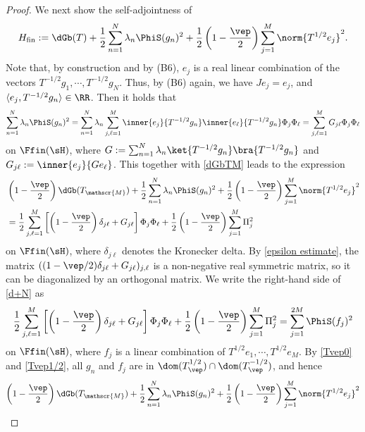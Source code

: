 \documentclass[12pt,draft]{article}
\theoremstyle{plain}
\numberwithin{equation}{section}
\theoremstyle{remark}
\begin{document}
\begin{proof}
We next show the self-adjointness of 
\[
H_{\rm fin}:=\dGb(T)+\frac{1}{2}\sum_{n=1}^N \lambda_n \PhiS(g_n)^2 + \frac{1}{2}\left(1-\frac{\vep}{2}\right) \sum_{j=1}^M \norm{T^{1/2}e_j}^2.
\]
Note that, by construction and by (B6), $e_j$ is a real linear combination of the vectors $T^{-1/2}g_1,\cdots,T^{-1/2}g_N$.
Thus, by (B6) again, we have $Je_j=e_j$, and $\langle e_j,T^{-1/2}g_n\rangle\in\RR$.
Then it holds that
\begin{align*}
 \sum_{n=1}^N \lambda_n \PhiS(g_n)^2
 = \sum_{n=1}^N \lambda_n \sum_{j,\ell=1}^M \inner{e_j}{T^{-1/2}g_n} \inner{e_\ell}{T^{-1/2}g_n} \Phi_j \Phi_\ell  
 = \sum_{j,\ell=1}^M G_{j\ell}\Phi_j \Phi_\ell  
\end{align*}
on $\Ffin(\sH)$, where $G:=\sum_{n=1}^N\lambda_n\ket{T^{-1/2}g_n} \bra{T^{-1/2}g_n}$ and $G_{j\ell}:=\inner{e_j}{Ge_\ell}$.
This together with \eqref{dGbTM} leads to the expression
\begin{align}\label{d+N}
&\left(1-\frac{\vep}{2}\right)\dGb(T_\mathscr{M}) + \frac{1}{2}\sum_{n=1}^N \lambda_n \PhiS(g_n)^2 + \frac{1}{2}\left(1-\frac{\vep}{2}\right) \sum_{j=1}^M \norm{T^{1/2}e_j}^2 \notag \\
&= \frac{1}{2}\sum_{j,\ell=1}^M \left[\left(1-\frac{\vep}{2}\right)\delta_{j\ell}+G_{j\ell}\right]\Phi_j \Phi_\ell  + \frac{1}{2}\left(1-\frac{\vep}{2}\right)\sum_{j=1}^M \Pi_j^2
\end{align}
on $\Ffin(\sH)$, where $\delta_{j\ell}$ denotes the Kronecker delta.
By \eqref{epsilon estimate}, the matrix $((1-\vep/2)\delta_{j\ell}+G_{j\ell})_{j,\ell}$ is a non-negative real symmetric matrix, 
so it can be diagonalized by an orthogonal matrix.
We write the right-hand side of \eqref{d+N} as
\begin{equation*}
  \frac{1}{2}\sum_{j,\ell=1}^M \left[\left(1-\frac{\vep}{2}\right)\delta_{j\ell}+G_{j\ell}\right]\Phi_j \Phi_\ell 
+ \frac{1}{2}\left(1-\frac{\vep}{2}\right)\sum_{j=1}^M \Pi_j^2
= \sum_{j=1}^{2M} \PhiS(f_j)^2
\end{equation*}
on $\Ffin(\sH)$,
where $f_j$ is a linear combination of $T^{1/2}e_1,\cdots,T^{1/2}e_M$.
By \eqref{Tvep0} and \eqref{Tvep1/2}, all $g_n$ and $f_j$ are in $\dom(T_\vep^{1/2})\cap\dom(T_\vep^{-1/2})$, and hence
\begin{equation*}
\left(1-\frac{\vep}{2}\right)\dGb(T_\mathscr{M}) + \frac{1}{2}\sum_{n=1}^N \lambda_n \PhiS(g_n)^2 + \frac{1}{2}\left(1-\frac{\vep}{2}\right) \sum_{j=1}^M \norm{T^{1/2}e_j}^2

\end{equation*}
\end{proof}
\end{document}
